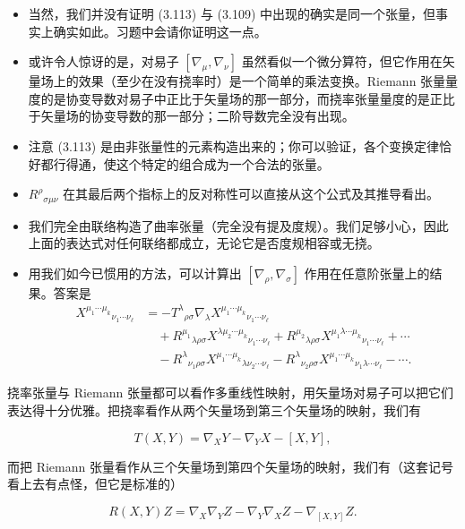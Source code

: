\begin{itemize}
\item 当然，我们并没有证明 (3.113) 与 (3.109) 中出现的确实是同一个张量，但事实上确实如此。习题中会请你证明这一点。
\item 或许令人惊讶的是，对易子 $[\nabla_\mu, \nabla_\nu]$ 虽然看似一个微分算符，但它作用在矢量场上的效果（至少在没有挠率时）是一个简单的乘法变换。Riemann 张量量度的是协变导数对易子中正比于矢量场的那一部分，而挠率张量量度的是正比于矢量场的协变导数的那一部分；二阶导数完全没有出现。
\item 注意 (3.113) 是由非张量性的元素构造出来的；你可以验证，各个变换定律恰好都行得通，使这个特定的组合成为一个合法的张量。
\item $R^\rho{}_{\sigma\mu\nu}$ 在其最后两个指标上的反对称性可以直接从这个公式及其推导看出。
\item 我们完全由联络构造了曲率张量（完全没有提及度规）。我们足够小心，因此上面的表达式对任何联络都成立，无论它是否度规相容或无挠。
\item 用我们如今已惯用的方法，可以计算出 $[\nabla_\rho, \nabla_\sigma]$ 作用在任意阶张量上的结果。答案是
\begin{align*}
[\nabla_\rho, \nabla_\sigma] X^{\mu_1\cdots\mu_k}{}_{\nu_1\cdots\nu_\ell}
&= -T^\lambda{}_{\rho\sigma}\nabla_\lambda X^{\mu_1\cdots\mu_k}{}_{\nu_1\cdots\nu_\ell}\\
&\quad + R^{\mu_1}{}_{\lambda\rho\sigma}X^{\lambda\mu_2\cdots\mu_k}{}_{\nu_1\cdots\nu_\ell} + R^{\mu_2}{}_{\lambda\rho\sigma}X^{\mu_1\lambda\cdots\mu_k}{}_{\nu_1\cdots\nu_\ell} + \cdots\\
&\quad - R^\lambda{}_{\nu_1\rho\sigma}X^{\mu_1\cdots\mu_k}{}_{\lambda\nu_2\cdots\nu_\ell} - R^\lambda{}_{\nu_2\rho\sigma}X^{\mu_1\cdots\mu_k}{}_{\nu_1\lambda\cdots\nu_\ell} - \cdots. \tag{3.114}
\end{align*}
\end{itemize}

挠率张量与 Riemann 张量都可以看作多重线性映射，用矢量场对易子可以把它们表达得十分优雅。把挠率看作从两个矢量场到第三个矢量场的映射，我们有

\begin{equation*}
T(X, Y) = \nabla_X Y - \nabla_Y X - [X, Y], \tag{3.115}
\end{equation*}

而把 Riemann 张量看作从三个矢量场到第四个矢量场的映射，我们有（这套记号看上去有点怪，但它是标准的）

\begin{equation*}
R(X, Y)Z = \nabla_X\nabla_Y Z - \nabla_Y\nabla_X Z - \nabla_{[X, Y]}Z. \tag{3.116}
\end{equation*}

